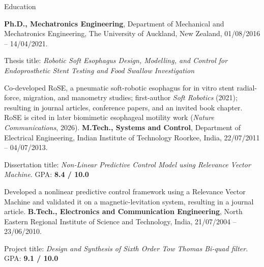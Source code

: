 \begin{rubric}{Education}

\entry*[2016 -- 2021]%
	\textbf{Ph.D., Mechatronics Engineering}, Department of Mechanical and Mechatronics Engineering, The University of Auckland, New Zealand, 01/08/2016 -- 14/04/2021.
	\par\smallskip Thesis title: \emph{Robotic Soft Esophagus Design, Modelling, and Control for Endoprosthetic Stent Testing and Food Swallow Investigation}
	\par\smallskip
	Co-developed RoSE, a pneumatic soft-robotic esophagus for in vitro stent radial-force, migration, and manometry studies; first-author \textit{Soft Robotics} (2021); resulting in journal articles, conference papers, and an invited book chapter. RoSE is cited in later biomimetic esophageal motility work (\textit{Nature Communications}, 2026).
%
\entry*[2011 -- 2013]%
	\textbf{M.Tech., Systems and Control}, Department of Electrical Engineering, Indian Institute of Technology Roorkee, India, 22/07/2011 -- 04/07/2013.\par\smallskip
	Dissertation title: \emph{Non-Linear Predictive Control Model using Relevance Vector Machine}.
	GPA: \textbf{8.4 / 10.0}
    \par\smallskip
    Developed a nonlinear predictive control framework using a Relevance Vector Machine and validated it on a magnetic-levitation system, resulting in a journal article.
%	
\entry*[2004 -- 2010]%
	\textbf{B.Tech., Electronics and Communication Engineering}, North Eastern Regional Institute of Science and Technology, India, 21/07/2004 -- 23/06/2010.\par\smallskip
	Project title: \emph{Design and Synthesis of Sixth Order Tow Thomas Bi-quad filter}.
	GPA: \textbf{9.1 / 10.0}
    
    
\end{rubric}

